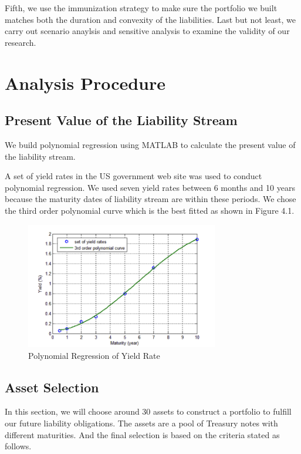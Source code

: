 \documentclass[oneside,12pt]{report}
\begin{document}
Fifth, we use the immunization strategy to make sure the portfolio we built matches both the duration and convexity of the liabilities.
Last but not least, we carry out scenario anaylsis and sensitive analysis to examine the validity of our research.
\newpage
\section{Analysis Procedure}

\subsection{Present Value of the Liability Stream}
\vspace{8pt}
We build polynomial regression using MATLAB to calculate the present value of the liability stream.

A set of yield rates in the US government web site was used to conduct polynomial regression. We used seven yield rates between 6 months and 10 years because the maturity dates of liability stream are within these periods. We chose the third order polynomial curve which is the best fitted as shown in Figure 4.1.
\begin{figure}[htb]
    \begin{center}
        \includegraphics[width=0.75\textwidth]{prm.png}
    \end{center}
    \caption{Polynomial Regression of Yield Rate}
\end{figure}


\subsection{Asset Selection}
\vspace{8pt}
In this section, we will choose around 30 assets to construct a portfolio to fulfill our future liability obligations. The assets are a pool of Treasury notes with different maturities. And the final selection is based on the criteria stated as follows.
\end{document}
